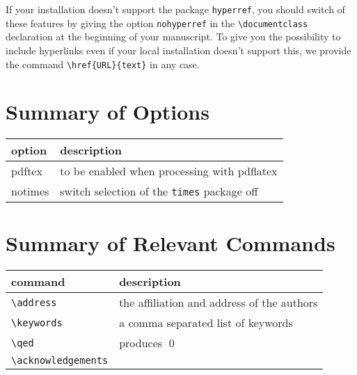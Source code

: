 \documentclass[%
]{algotel}
\begin{document}
If your installation doesn't support the package \texttt{hyperref},
you should switch of these features by giving the option
\texttt{nohyperref} in the \verb!\documentclass! declaration at the
beginning of your manuscript.  To give you the possibility to include
hyperlinks even if your local installation doesn't support this, we
provide the command \verb!\href{URL}{text}! in any case.


\section{Summary of Options}
\label{sec:options}
\begin{tabular}{|l|p{6cm}|}
\hline
option & description\\
\hline
pdftex & to be enabled when processing with pdflatex\\
notimes & switch selection of the \texttt{times} package off\\
\hline
\end{tabular}


\section{Summary of Relevant Commands}
\label{sec:commands}

\begin{tabular}{|l|p{6cm}|}
\hline
command & description\\
\hline
\verb!\address! & the affiliation and address of the authors\\
\hline
\verb!\keywords! & a comma separated list of keywords\\
\hline
\verb!\qed! & produces \qed\\
\hline
\verb!\acknowledgements! & \\
\hline
\end{tabular}


\nocite{*}


\label{sec:biblio}
\end{document}
